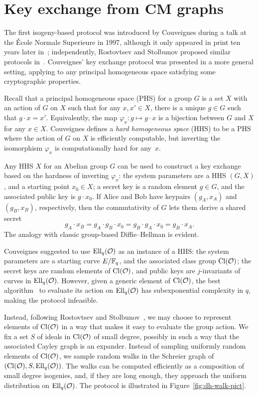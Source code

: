 \documentclass{report}
\theoremstyle{plain}
\theoremstyle{definition}
\begin{document}

\section{Key exchange from CM graphs}

The first isogeny-based protocol was introduced by Couveignes during a
talk at the École Normale Superieure in 1997, although it only
appeared in print ten years later in~\cite{cryptoeprint:2006:291};
independently, Rostovtsev and Stolbunov proposed similar protocols
in~\cite{rostovtsev+stolbunov06,Stol}. %
Couveignes' key exchange protocol was presented in a more general
setting, applying to any principal homogeneous space satisfying some
cryptographic properties.

Recall that a principal homogeneous space (PHS) for a group $G$ is a
set $X$ with an action of $G$ on $X$ such that for any $x,x'\in X$,
there is a unique $g\in G$ such that $g\cdot x = x'$. %
Equivalently, the map $φ_x: g\mapsto g\cdot x$ is a bijection between
$G$ and $X$ for any $x\in X$. %
Couveignes defines a \emph{hard homogeneous space} (HHS) to be a PHS
where the action of $G$ on $X$ is efficiently computable, but
inverting the isomorphism $φ_x$ is computationally hard for any~$x$.

Any HHS $X$ for an Abelian group $G$ can be used to construct a key
exchange based on the hardness of inverting $\varphi_x$: the system
parameters are a HHS $(G,X)$, and a starting point $x_0∈X$; a secret
key is a random element $g∈G$, and the associated public key is
$g·x_0$. %
If Alice and Bob have keypairs $(g_A,x_A)$ and $(g_B,x_B)$,
respectively, then the commutativity of $G$ lets them derive a shared
secret
\begin{equation*}
  g_A·x_B = g_A·g_B· x_0 = g_B·g_A·x_0 = g_B·x_A.
\end{equation*}
The analogy with classic group-based Diffie--Hellman is evident.

Couveignes suggested to use $\operatorname{Ell}_q(\mathcal{O})$ as an instance of a HHS: the
system parameters are a starting curve $E/\mathbb{F}_q$, and the associated
class group $\operatorname{Cl}(\mathcal{O})$; the secret keys are random elements of
$\operatorname{Cl}(\mathcal{O})$, and public keys are $j$-invariants of curves in
$\operatorname{Ell}_q(\mathcal{O})$. %
However, given a generic element of $\operatorname{Cl}(\mathcal{O})$, the best
algorithm~\cite{jao+soukharev10} to evaluate its action on
$\operatorname{Ell}_q(\mathcal{O})$ has subexponential complexity in $q$, making the protocol
infeasible. %

Instead, following Rostovtsev and
Stolbunov~\cite{rostovtsev+stolbunov06}, we may choose to represent
elements of $\operatorname{Cl}(\mathcal{O})$ in a way that makes it easy to evaluate the
group action. %
We fix a set $S$ of ideals in $\operatorname{Cl}(\mathcal{O})$ of small degree, possibly in
such a way that the associated Cayley graph is an expander. %
Instead of sampling uniformly random elements of $\operatorname{Cl}(\mathcal{O})$, we sample
random walks in the Schreier graph of $(\operatorname{Cl}(\mathcal{O}),S,\operatorname{Ell}_q(\mathcal{O}))$. %
The walks can be computed efficiently as a composition of small degree
isogenies, and, if they are long enough, they approach the uniform
distribution on $\operatorname{Ell}_q(\mathcal{O})$. %
The protocol is illustrated in Figure~\ref{fig:dh-walk-pict}. %
\end{document}
